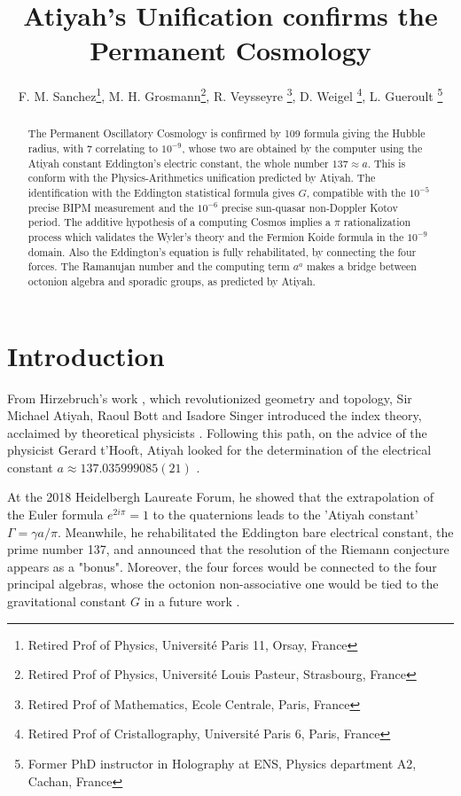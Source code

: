 \documentclass[a4paper,9pt]{article}
\title{Atiyah's Unification confirms the Permanent Cosmology}
\author{F. M. Sanchez\thanks{Retired Prof of Physics, Universit\'{e} Paris 11, Orsay, France}, M. H. Grosmann\thanks{Retired Prof of Physics, Universit\'{e} Louis Pasteur, Strasbourg, France}, R. Veysseyre \thanks{Retired Prof of Mathematics, Ecole Centrale, Paris, France}, D. Weigel \thanks{Retired Prof of Cristallography, Universit\'{e} Paris 6, Paris, France}, L. Gueroult \thanks{Former PhD instructor in Holography at ENS, Physics department A2, Cachan, France}}
\begin{document}
\setcounter{page}{1}

\maketitle

\begin{abstract}
The Permanent Oscillatory Cosmology is confirmed by 109 formula giving the Hubble radius, with 7 correlating to $10^{-9}$, whose two are obtained by the computer using the Atiyah constant Eddington's electric constant, the whole number $137 \approx a $. This is conform with the Physics-Arithmetics unification predicted by Atiyah. The identification with the Eddington statistical formula gives $G$, compatible with the $10^{-5}$ precise BIPM measurement and the $10^{-6}$ precise sun-quasar non-Doppler Kotov period. The additive hypothesis of a computing Cosmos implies a $\pi$ rationalization process which validates the Wyler's theory and the Fermion Koide formula in the $10^{-9}$ domain. Also the Eddington's equation is fully rehabilitated, by connecting the four forces. The Ramanujan number and the computing term $a^a$ makes a bridge between octonion algebra and sporadic groups, as predicted by Atiyah.   
\end{abstract}





\label{sec:headings}

\section{Introduction}
  
    From Hirzebruch's work \cite{Hirzebruch}, which revolutionized geometry and topology, Sir Michael Atiyah, Raoul Bott \cite{Bott} and Isadore Singer \cite{Singer} introduced the index theory, acclaimed by theoretical physicists \cite{Alvarez}. Following this path, on the advice of the physicist Gerard t'Hooft, Atiyah looked for the determination of the electrical constant $a \approx 137.035999085(21)$ \cite{Atiyah}.
    
    
    At the 2018 Heidelbergh Laureate Forum, he showed that the extrapolation of the Euler formula  $e^{2i\pi} = 1$ to the quaternions leads to the 'Atiyah constant' $\Gamma = \gamma a/\pi $. Meanwhile, he rehabilitated the Eddington \cite{Eddington} bare electrical constant, the prime number 137, and announced that the resolution of the Riemann conjecture appears as a "bonus". Moreover, the four forces would be connected to the four principal algebras, whose the octonion non-associative one would be tied to the gravitational constant $G$ in a future work \cite{Atiyah}. 
    
\end{document}
